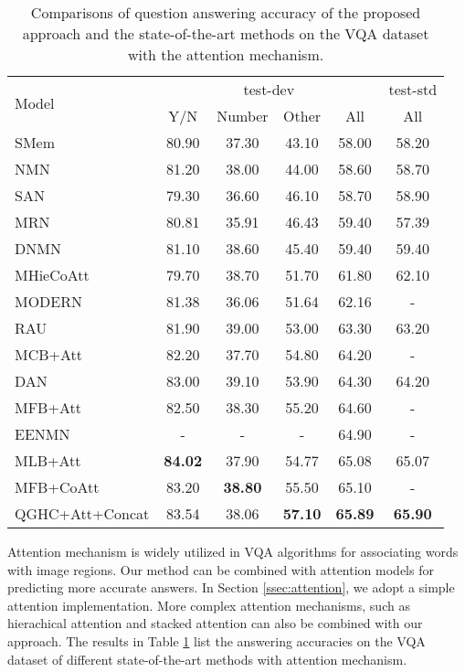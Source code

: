 \documentclass[runningheads]{llncs}
\begin{document}
\begin{table}[tb]
\scriptsize
\centering
\begin{tabular}{l c c c c c}
\toprule
\multirow{2}{*}{Model} &      \multicolumn{4}{c}{test-dev} & \multicolumn{1}{c}{test-std} \\
\cmidrule(lr){2-5} \cmidrule(lr){6-6} 
 & Y/N  &Number & Other & All & All\\
\hline
SMem \cite{xu2016ask} & 80.90 & 37.30  & 43.10  & 58.00 & 58.20    \\
NMN \cite{andreas2016neural}& 81.20 & 38.00 & 44.00 & 58.60 &   58.70    \\
SAN \cite{yang2016stacked}& 79.30 & 36.60 & 46.10 & 58.70 &  58.90 \\     
MRN \cite{kim2016multimodal}& 80.81 & 35.91 & 46.43 & 59.40 & 57.39 \\
DNMN \cite{andreas2016learning}& 81.10 & 38.60 & 45.40 & 59.40 & 59.40 \\
MHieCoAtt \cite{lu2016hierarchical}&79.70 &38.70 & 51.70 & 61.80 & 62.10 \\
MODERN \cite{de2017modulating}& 81.38 & 36.06 & 51.64 & 62.16 & -\\
RAU \cite{noh2016training}& 81.90 & 39.00 & 53.00 & 63.30 &   63.20  \\
MCB+Att \cite{fukui2016multimodal}& 82.20 & 37.70 & 54.80 & 64.20 &  -\\
DAN \cite{nam2016dual}&  83.00 & 39.10 & 53.90 & 64.30 &  64.20 \\ 
MFB+Att \cite{yu2017multi}& 82.50  & 38.30  & 55.20  & 64.60 & - \\
EENMN \cite{hu2017learning}&  - & -   & -   &  64.90 &  -\\
MLB+Att \cite{kim2016hadamard}& \textbf{84.02} & 37.90 & 54.77 & 65.08 & 65.07 \\
MFB+CoAtt \cite{yu2017multi}& 83.20 & \textbf{38.80} & 55.50 & 65.10 &   -     \\
\hline
QGHC+Att+Concat &  83.54  &  38.06   &  \textbf{57.10}     &  \textbf{65.89}   &   \textbf{65.90} \\
\bottomrule
\end{tabular}
\caption{Comparisons of question answering accuracy of the proposed approach and the state-of-the-art methods on the VQA dataset with the attention mechanism.}
\label{tab:vqa}
\end{table}



Attention mechanism is widely utilized in VQA algorithms for associating words with image regions.
Our method can be combined with attention models for predicting more accurate answers. In Section \ref{ssec:attention}, we adopt a simple attention implementation. More complex attention mechanisms, such as hierachical attention \cite{lu2016hierarchical} and stacked attention \cite{yang2016stacked} can also be combined with our approach. 
The results in Table \ref{tab:vqa} list the answering accuracies on the VQA dataset of different state-of-the-art methods with attention mechanism.
\end{document}
